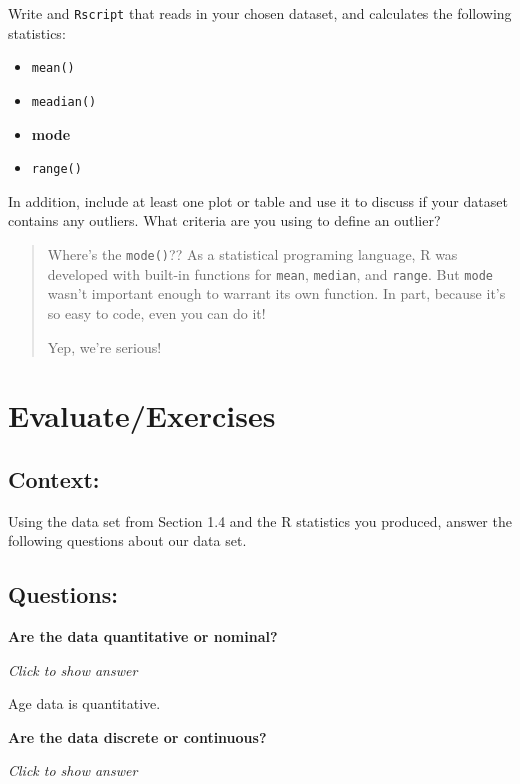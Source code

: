 \documentclass[
]{book}
\providecommand{\tightlist}{%
  \setlength{\itemsep}{0pt}\setlength{\parskip}{0pt}}
\begin{document}
Write and \texttt{Rscript} that reads in your chosen dataset, and calculates the
following statistics:

\begin{itemize}
\tightlist
\item
  \texttt{mean()}
\item
  \texttt{meadian()}
\item
  \textbf{mode}
\item
  \texttt{range()}
\end{itemize}

In addition, include at least one plot or table and use it to discuss if your dataset contains any outliers. What criteria are you using to define an outlier?

\begin{quote}
Where's the \texttt{mode()}?? As a statistical programing language, R was developed with
built-in functions for \texttt{mean}, \texttt{median}, and \texttt{range}. But \texttt{mode} wasn't important
enough to warrant its own function. In part, because it's so easy to code, even you
can do it!

Yep, we're serious!
\end{quote}

\hypertarget{evaluateexercises}{%
\section{Evaluate/Exercises}\label{evaluateexercises}}

\hypertarget{context}{%
\subsection{Context:}\label{context}}

Using the data set from Section 1.4 and the R statistics you produced,
answer the following questions about our data set.

\hypertarget{questions}{%
\subsection{Questions:}\label{questions}}

\textbf{Are the data quantitative or nominal?}

\emph{Click to show answer}

Age data is quantitative.

\textbf{Are the data discrete or continuous?}

\emph{Click to show answer}
\end{document}

